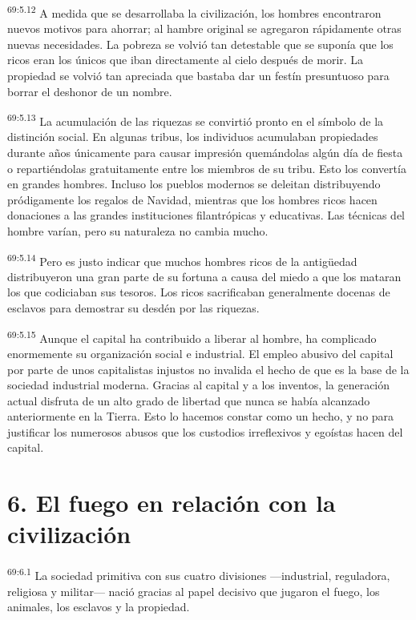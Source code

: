 \par
\textsuperscript{69:5.12} A medida que se desarrollaba la civilización, los hombres encontraron nuevos motivos para ahorrar; al hambre original se agregaron rápidamente otras nuevas necesidades. La pobreza se volvió tan detestable que se suponía que los ricos eran los únicos que iban directamente al cielo después de morir. La propiedad se volvió tan apreciada que bastaba dar un festín presuntuoso para borrar el deshonor de un nombre.

\par
\textsuperscript{69:5.13} La acumulación de las riquezas se convirtió pronto en el símbolo de la distinción social. En algunas tribus, los individuos acumulaban propiedades durante años únicamente para causar impresión quemándolas algún día de fiesta o repartiéndolas gratuitamente entre los miembros de su tribu. Esto los convertía en grandes hombres. Incluso los pueblos modernos se deleitan distribuyendo pródigamente los regalos de Navidad, mientras que los hombres ricos hacen donaciones a las grandes instituciones filantrópicas y educativas. Las técnicas del hombre varían, pero su naturaleza no cambia mucho.

\par
\textsuperscript{69:5.14} Pero es justo indicar que muchos hombres ricos de la antig\"uedad distribuyeron una gran parte de su fortuna a causa del miedo a que los mataran los que codiciaban sus tesoros. Los ricos sacrificaban generalmente docenas de esclavos para demostrar su desdén por las riquezas.

\par
\textsuperscript{69:5.15} Aunque el capital ha contribuido a liberar al hombre, ha complicado enormemente su organización social e industrial. El empleo abusivo del capital por parte de unos capitalistas injustos no invalida el hecho de que es la base de la sociedad industrial moderna. Gracias al capital y a los inventos, la generación actual disfruta de un alto grado de libertad que nunca se había alcanzado anteriormente en la Tierra. Esto lo hacemos constar como un hecho, y no para justificar los numerosos abusos que los custodios irreflexivos y egoístas hacen del capital.

\section*{6. El fuego en relación con la civilización}
\par
\textsuperscript{69:6.1} La sociedad primitiva con sus cuatro divisiones ---industrial, reguladora, religiosa y militar--- nació gracias al papel decisivo que jugaron el fuego, los animales, los esclavos y la propiedad.

